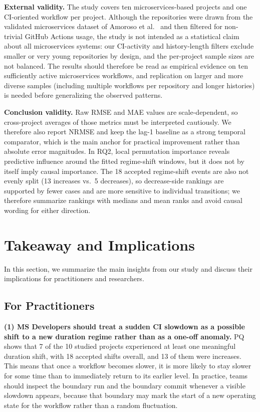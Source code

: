 \documentclass[conference]{IEEEconf}
\begin{document}
\noindent\textbf{External validity.} The study covers ten microservices-based projects and one CI-oriented workflow per project. Although the repositories were drawn from the validated microservices dataset of Amoroso et al.\ \cite{amoroso2024dataset} and then filtered for non-trivial GitHub Actions usage, the study is not intended as a statistical claim about all microservices systems: our CI-activity and history-length filters exclude smaller or very young repositories by design, and the per-project sample sizes are not balanced. The results should therefore be read as empirical evidence on ten sufficiently active microservices workflows, and replication on larger and more diverse samples (including multiple workflows per repository and longer histories) is needed before generalizing the observed patterns.

\noindent\textbf{Conclusion validity.} Raw RMSE and MAE values are scale-dependent, so cross-project averages of those metrics must be interpreted cautiously. We therefore also report NRMSE and keep the lag-1 baseline as a strong temporal comparator, which is the main anchor for practical improvement rather than absolute error magnitudes. In RQ2, local permutation importance reveals predictive influence around the fitted regime-shift windows, but it does not by itself imply causal importance. The 18 accepted regime-shift events are also not evenly split (13 increases vs.\ 5 decreases), so decrease-side rankings are supported by fewer cases and are more sensitive to individual transitions; we therefore summarize rankings with medians and mean ranks and avoid causal wording for either direction.

\section{Takeaway and Implications}
In this section, we summarize the main insights from our study and discuss their implications for practitioners and researchers.

\subsection{For Practitioners}

\textbf{(1) MS Developers should treat a sudden CI slowdown as a possible shift to a new duration regime rather than as a one-off anomaly.}
PQ shows that 7 of the 10 studied projects experienced at least one meaningful duration shift, with 18 accepted shifts overall, and 13 of them were increases. This means that once a workflow becomes slower, it is more likely to stay slower for some time than to immediately return to its earlier level. In practice, teams should inspect the boundary run and the boundary commit whenever a visible slowdown appears, because that boundary may mark the start of a new operating state for the workflow rather than a random fluctuation.
\end{document}
